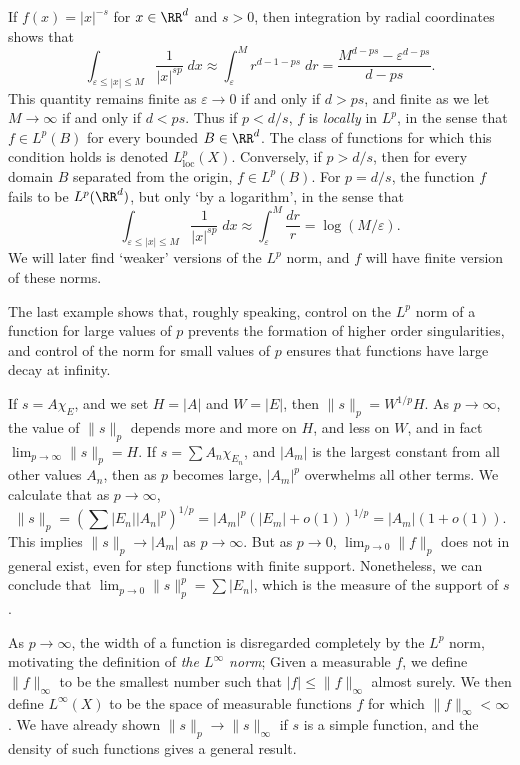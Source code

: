\begin{example}
  If $f(x) = |x|^{-s}$ for $x \in \RR^d$ and $s > 0$, then integration by radial coordinates shows that
  \[ \int_{\varepsilon \leq |x| \leq M} \frac{1}{|x|^{s p}}\; dx \approx \int_\varepsilon^M r^{d-1 - ps}\; dr = \frac{M^{d - p s} - \varepsilon^{d - p s}}{d - p s}. \]
  This quantity remains finite as $\varepsilon \to 0$ if and only if $d > p s$, and finite as we let $M \to \infty$ if and only if $d < p s$. Thus if $p < d/s$, $f$ is \emph{locally} in $L^p$, in the sense that $f \in L^p(B)$ for every bounded $B \in \RR^d$. The class of functions for which this condition holds is denoted $L^p_{\text{loc}}(X)$. Conversely, if $p > d/s$, then for every domain $B$ separated from the origin, $f \in L^p(B)$. For $p = d/s$, the function $f$ fails to be $L^p(\RR^d)$, but only `by a logarithm', in the sense that
  \[ \int_{\varepsilon \leq |x| \leq M} \frac{1}{|x|^{s p}}\; dx \approx \int_\varepsilon^M \frac{dr}{r} = \log(M/\varepsilon). \]
  We will later find `weaker' versions of the $L^p$ norm, and $f$ will have finite version of these norms.
\end{example}

The last example shows that, roughly speaking, control on the $L^p$ norm of a function for large values of $p$ prevents the formation of higher order singularities, and control of the norm for small values of $p$ ensures that functions have large decay at infinity.

\begin{example}
  If $s = A \chi_E$, and we set $H = |A|$ and $W = |E|$, then $\| s \|_p = W^{1/p} H$. As $p \to \infty$, the value of $\| s \|_p$ depends more and more on $H$, and less on $W$, and in fact $\lim_{p \to \infty} \| s \|_p = H$. If $s = \sum A_n \chi_{E_n}$, and $|A_m|$ is the largest constant from all other values $A_n$, then as $p$ becomes large, $|A_m|^p$ overwhelms all other terms. We calculate that as $p \to \infty$,
  \[ \| s \|_p = \left( \sum |E_n| |A_n|^p \right)^{1/p} = |A_m|^p (|E_m| + o(1))^{1/p} = |A_m| (1 + o(1)). \]
  This implies $\| s \|_p \to |A_m|$ as $p \to \infty$. But as $p \to 0$, $\lim_{p \to 0} \| f \|_p$ does not in general exist, even for step functions with finite support. Nonetheless, we can conclude that $\lim_{p \to 0} \| s \|_p^p = \sum |E_n|$, which is the measure of the support of $s$.
\end{example}

As $p \to \infty$, the width of a function is disregarded completely by the $L^p$ norm, motivating the definition of \emph{the $L^\infty$ norm}; Given a measurable $f$, we define $\| f \|_\infty$ to be the smallest number such that $|f| \leq \| f \|_\infty$ almost surely. We then define $L^\infty(X)$ to be the space of measurable functions $f$ for which $\| f \|_\infty < \infty$. We have already shown $\| s \|_p \to \| s \|_\infty$ if $s$ is a simple function, and the density of such functions gives a general result.

